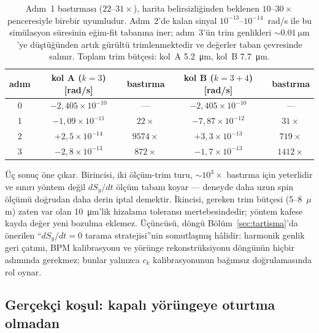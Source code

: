 \documentclass[preprint,12pt]{elsarticle}
\begin{document}
\begin{table}[h]
\centering
\caption{İteratif ölç--trimle döngüsü (taze desen, desen bilgisi
kullanılmadan). Adım~0 trimsiz taban; her adımda trim genliği
denklem~(\ref{eq:trim-dongu}) ile yalnızca bir önceki ölçümden hesaplanır.}
\label{tab:iteratif}
\begin{tabular}{ccccc}
\toprule
adım & kol A ($k{=}3$) [rad/s] & bastırma & kol B ($k{=}3{+}4$) [rad/s] & bastırma \\
\midrule
0 & $-2{,}405\times10^{-10}$ & --- & $-2{,}405\times10^{-10}$ & --- \\
1 & $-1{,}09\times10^{-11}$ & $22\times$ & $-7{,}87\times10^{-12}$ & $31\times$ \\
2 & $+2{,}5\times10^{-14}$ & $9574\times$ & $+3{,}3\times10^{-13}$ & $719\times$ \\
3 & $-2{,}8\times10^{-13}$ & $872\times$ & $-1{,}7\times10^{-13}$ & $1412\times$ \\
\bottomrule
\end{tabular}
\caption*{Adım~1 bastırması ($22$--$31\times$), harita belirsizliğinden
beklenen $10$--$30\times$ penceresiyle birebir uyumludur. Adım~2'de kalan
sinyal $10^{-13}$--$10^{-14}$~rad/s ile bu simülasyon süresinin eğim-fit
tabanına iner; adım~3'ün trim genlikleri $\sim\SI{0.01}{\micro\meter}$'ye
düştüğünden artık gürültü trimlenmektedir ve değerler taban çevresinde
salınır. Toplam trim bütçesi: kol~A \SI{5.2}{\micro\meter},
kol~B \SI{7.7}{\micro\meter}.}
\end{table}

Üç sonuç öne çıkar. Birincisi, iki ölçüm-trim turu, $\sim10^3\times$
bastırma için yeterlidir ve sınırı yöntem değil $dS_y/dt$ ölçüm tabanı
koyar — deneyde daha uzun spin ölçümü doğrudan daha derin iptal demektir.
İkincisi, gereken trim bütçesi (5--8~$\mu$m) zaten var olan
\SI{10}{\micro\meter}'lik hizalama toleransı mertebesindedir; yöntem
kafese kayda değer yeni bozulma eklemez. Üçüncüsü, döngü
Bölüm~\ref{sec:tartisma}'da önerilen ``$dS_y/dt=0$ tarama stratejisi''nin
somutlaşmış hâlidir: harmonik genlik geri çatımı, BPM kalibrasyonu ve
yörünge rekonstrüksiyonu döngünün hiçbir adımında gerekmez; bunlar yalnızca
$c_k$ kalibrasyonunun bağımsız doğrulamasında rol oynar.

\subsection{Gerçekçi koşul: kapalı yörüngeye oturtma olmadan}
\label{sec:trim-gercekci}
\end{document}
